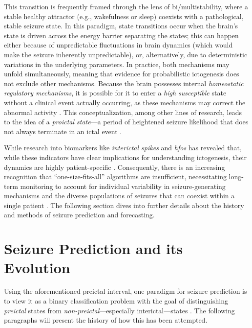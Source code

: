 This transition is frequently framed through the lens of bi/multistability, where a stable healthy attractor (e.g., wakefulness or sleep) coexists with a pathological, stable seizure state.
In this paradigm, state transitions occur when the brain's state is driven across the energy barrier separating the states; this can happen either because of unpredictable fluctuations in brain dynamics (which would make the seizure inherently unpredictable), or, alternatively, due to deterministic variations in the underlying parameters.
In practice, both mechanisms may unfold simultaneously, meaning that evidence for probabilistic ictogenesis does not exclude other mechanisms.
Because the brain possesses internal \textit{homeostatic regulatory mechanisms}, it is possible for it to enter a \textit{high susceptible} state without a clinical event actually occurring, as these mechanisms may correct the abnormal activity \parencite{freestone_forward-looking_2017}.
This conceptualization, among other lines of research, leads to the idea of a \textit{proictal state}---a period of heightened seizure likelihood that does not always terminate in an ictal event \parencite{muller_coherent_2022}.

While research into biomarkers like \textit{interictal spikes} and \textit{\glspl{hfo}} has revealed that, while these indicators have clear implications for understanding ictogenesis, their dynamics are highly patient-specific \parencite{freestone_forward-looking_2017}.
Consequently, there is an increasing recognition that \enquote{one-size-fits-all} algorithms are insufficient, necessitating long-term monitoring to account for individual variability in seizure-generating mechanisms and the diverse populations of seizures that can coexist within a single patient \parencite{freestone_forward-looking_2017, yang_seizure_2024}.
The following section dives into further details about the history and methods of seizure prediction and forecasting.



\section{Seizure Prediction and its Evolution}
Using the aforementioned preictal interval, one paradigm for seizure prediction is to view it as a binary classification problem with the goal of distinguishing \textit{preictal} states from \textit{non-preictal}---especially interictal---states \parencite{yang_seizure_2024}. 
The following paragraphs will present the history of how this has been attempted.


